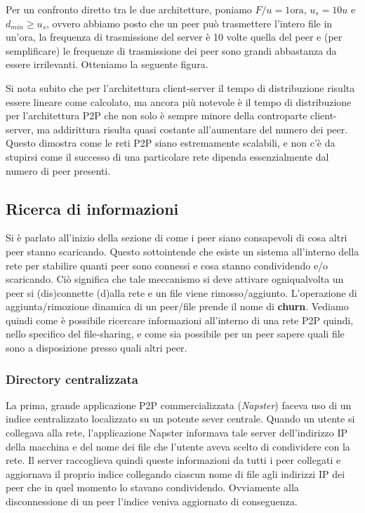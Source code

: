 Per un confronto diretto tra le due architetture, poniamo $F/u = 1 \text{ora}$, $u_s = 10u$ e $d_{min} \geq u_s$, ovvero abbiamo posto che un peer può trasmettere l'intero file in un'ora, la frequenza di trasmissione del server è 10 volte quella del peer e (per semplificare) le frequenze di trasmissione dei peer sono grandi abbastanza da essere irrilevanti. Otteniamo la seguente figura.


Si nota subito che per l'architettura client-server il tempo di distribuzione risulta essere lineare come calcolato, ma ancora più notevole è il tempo di distribuzione per l'architettura P2P che non solo è sempre minore della controparte client-server, ma addirittura risulta quasi costante all'aumentare del numero dei peer. Questo dimostra come le reti P2P siano estremamente scalabili, e non c'è da stupirsi come il successo di una particolare rete dipenda essenzialmente dal numero di peer presenti. %

\subsection{Ricerca di informazioni}\label{ricerca-di-informazioni}

Si è parlato all'inizio della sezione di come i peer siano consapevoli di cosa altri peer stanno scaricando. Questo sottointende che esiste un sistema all'interno della rete per stabilire quanti peer sono connessi e cosa stanno condividendo e/o scaricando. Ciò significa che tale meccanismo si deve attivare ogniqualvolta un peer si (dis)connette (d)alla rete e un file viene rimosso/aggiunto. L'operazione di aggiunta/rimozione dinamica di un peer/file prende il nome di \textbf{churn}. Vediamo quindi come è possibile ricercare informazioni all'interno di una rete P2P quindi, nello specifico del file-sharing, e come sia possibile per un peer sapere quali file sono a disposizione presso quali altri peer.

\subsubsection{Directory centralizzata}\label{directory-centralizzata}

La prima, grande applicazione P2P commercializzata (\emph{Napster}) faceva uso di un indice centralizzato localizzato su un potente sever centrale. Quando un utente si collegava alla rete, l'applicazione Napster informava tale server dell'indirizzo IP della macchina e del nome dei file che l'utente aveva scelto di condividere con la rete. Il server raccoglieva quindi queste informazioni da tutti i peer collegati e aggiornava il proprio indice collegando ciascun nome di file agli indirizzi IP dei peer che in quel momento lo stavano condividendo. Ovviamente alla disconnessione di un peer l'indice veniva aggiornato di conseguenza.

